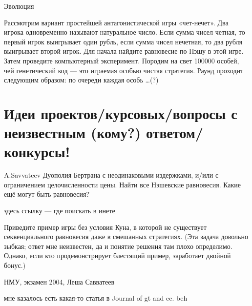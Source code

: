 \begin{problem}
 Эволюция

Рассмотрим вариант простейшей антагонистической игры «чет-нечет». Два игрока одновременно называют натуральное число. Если сумма чисел четная, то первый игрок выигрывает один рубль, если сумма чисел нечетная, то два рубля выигрывает второй игрок. Для начала найдите равновесие по Нэшу в этой игре. Затем проведите компьютерный эксперимент. Породим на свет 100000 особей, чей генетический код — это играемая особью чистая стратегия. Раунд проходит следующим образом: по очереди каждая особь \ldots (?)



\begin{sol}

\end{sol}
\end{problem}














\section{Идеи проектов/курсовых/вопросы с неизвестным (кому?) ответом/конкурсы!}


\begin{problem}
 A.Savvateev
Дуополия Бертрана с неодинаковыми издержками,
и/или с ограничением целочисленности цены. Найти
все Нэшевские равновесия. Какие ещё могут быть
равновесия?



\begin{sol}
здесь ссылку — где поискать в инете
\end{sol}
\end{problem}




\begin{problem}
 Приведите пример игры без условия Куна, в которой не существует секвенциального равновесия даже в смешанных стратегиях. (Эта задача довольно зыбкая; ответ мне неизвестен, да и понятие решения там плохо определимо. Однако, если кто продемонстрирует блестящий пример, заработает двойной бонус.)



\begin{source}
НМУ, экзамен 2004, Леша Савватеев
\end{source}


\begin{sol}
мне казалось есть какая-то статья в Journal of gt and ec. beh
\end{sol}
\end{problem}







